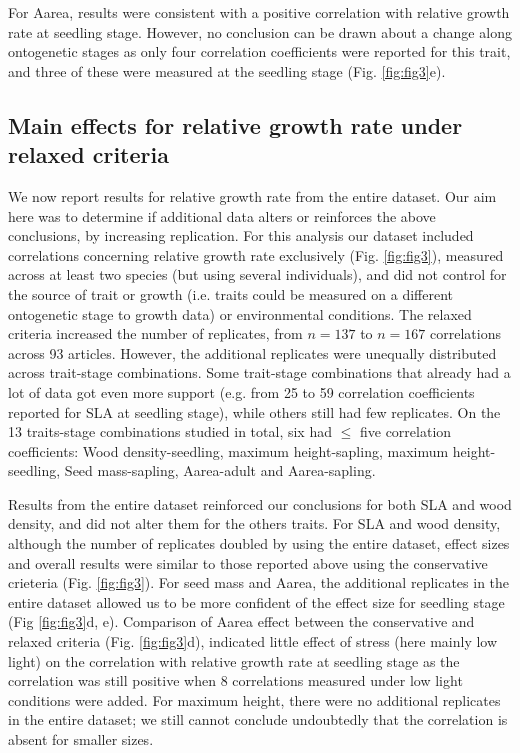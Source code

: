 \documentclass[a4paper,11pt]{article}
\begin{document}
For Aarea, results were consistent with a positive correlation with relative growth rate at seedling stage. However, no conclusion can be drawn about a change along ontogenetic stages as only four correlation coefficients were reported for this trait, and three of these were measured at the seedling stage (Fig. \ref{fig:fig3}e).

\subsection*{Main effects for relative growth rate under relaxed criteria}

We now report results for relative growth rate from the entire dataset. Our aim here was to determine if additional data alters or reinforces the above conclusions, by increasing replication. For this analysis our dataset included correlations concerning relative growth rate exclusively (Fig. \ref{fig:fig3}), measured across at least two species (but using several individuals), and did not control for the source of trait or growth (i.e. traits could be measured on a different ontogenetic stage to growth data) or environmental conditions. The relaxed criteria increased the number of replicates, from $n = 137$ to $n = 167$ correlations across 93 articles. However, the additional replicates were unequally distributed across trait-stage combinations. Some trait-stage combinations that already had a lot of data got even more support (e.g. from 25 to 59 correlation coefficients reported for SLA at seedling stage), while others still had few replicates. On the 13 traits-stage combinations studied in total, six had $\le$ five correlation coefficients: Wood density-seedling, maximum height-sapling, maximum height-seedling, Seed mass-sapling, Aarea-adult and Aarea-sapling.

Results from the entire dataset reinforced our conclusions for both SLA and wood density, and did not alter them for the others traits. For SLA and wood density, although the number of replicates doubled by using the entire dataset, effect sizes and overall results were similar to those reported above using the conservative crieteria (Fig. \ref{fig:fig3}). For seed mass and Aarea, the additional replicates in the entire dataset allowed us to be more confident of the effect size for seedling stage (Fig \ref{fig:fig3}d, e). Comparison of Aarea effect between the conservative and relaxed criteria (Fig. \ref{fig:fig3}d), indicated little effect of stress (here mainly low light) on the correlation with relative growth rate at seedling stage as the correlation was still positive when 8 correlations measured under low light conditions were added. For maximum height, there were no additional replicates in the entire dataset; we still cannot conclude undoubtedly that the correlation is absent for smaller sizes.
\end{document}
